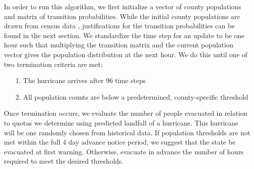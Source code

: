 \documentclass[titlepage]{article}
\begin{document}
    In order to run this algorithm, we first initialize a vector of county populations and matrix of transition probabilities. While the initial county populations are drawn from census data \cite{census}, justifications for the transition probabilities can be found in the next section. We standardize the time step for an update to be one hour such that multiplying the transition matrix and the current population vector gives the population distribution at the next hour. We do this until one of two termination criteria are met:
    \begin{itemize}
      \item[1.]
        The hurricane arrives after 96 time steps
      \item[2.]
        All population counts are below a predetermined, county-specific threshold
    \end{itemize}

    Once termination occurs, we evaluate the number of people evacuated in relation to quotas we determine using predicted landfall of a hurricane. This hurricane will be one randomly chosen from historical data. If population thresholds are not met within the full 4 day advance notice period, we suggest that the state be evacuated at first warning. Otherwise, evacuate in advance the number of hours required to meet the desired thresholds.
\end{document}
